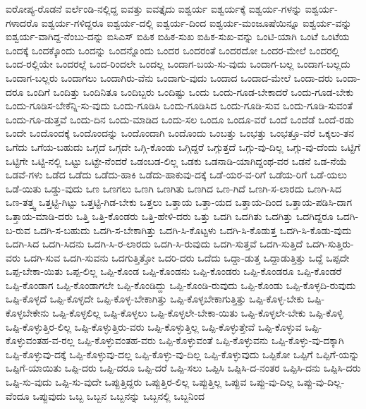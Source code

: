 {ಐರೋಪ್ಯ-ರೊಡನೆ
ಐರ್ಲೆಂಡಿ-ನಲ್ಲಿದ್ದ
ಐವತ್ತು
ಐವತ್ತೈದು
ಐಶ್ವರ್ಯ
ಐಶ್ವರ್ಯಕ್ಕೆ
ಐಶ್ವರ್ಯ-ಗಳನ್ನು
ಐಶ್ವರ್ಯ-ಗಳಾದರೊ
ಐಶ್ವರ್ಯ-ಗಳಿದ್ದರೂ
ಐಶ್ವರ್ಯ-ದಲ್ಲಿ
ಐಶ್ವರ್ಯ-ದಿಂದ
ಐಶ್ವರ್ಯ-ಮಂಜೂಷೆಯಿನ್ನೂ
ಐಶ್ವರ್ಯ-ವನ್ನು
ಐಶ್ವರ್ಯ-ವಾಗಿದ್ದ-ನೆಂಬು-ದನ್ನು
ಐಸಿಎಸ್
ಐಹಿಕ
ಐಹಿಕ-ಸುಖ
ಐಹಿಕ-ಸುಖ-ವನ್ನು
ಒಂಟಿ-ಯಾಗಿ
ಒಂಟೆ
ಒಂಟೆಯ
ಒಂದಕ್ಕೆ
ಒಂದಕ್ಕೊಂದು
ಒಂದನ್ನು
ಒಂದನ್ನೊಂದು
ಒಂದರ
ಒಂದರಂತೆ
ಒಂದರದೋ
ಒಂದರ-ಮೇಲೆ
ಒಂದರಲ್ಲಿ
ಒಂದ-ರಲ್ಲಿಯೇ
ಒಂದರಲ್ಲೆ
ಒಂದ-ರಿಂದಲೇ
ಒಂದಲ್ಲ
ಒಂದಾಗ-ಬಯ-ಸು-ವುದು
ಒಂದಾಗ-ಬಲ್ಲ
ಒಂದಾಗ-ಬಲ್ಲದು
ಒಂದಾಗ-ಬಲ್ಲರು
ಒಂದಾಗಲು
ಒಂದಾಗಿರು-ವೆನು
ಒಂದಾಗು-ವುದು
ಒಂದಾದ
ಒಂದಾದ-ಮೇಲೆ
ಒಂದಾ-ದರು
ಒಂದಾ-ದರೂ
ಒಂದಿಗೆ
ಒಂದಿತ್ತು
ಒಂದಿನಿತೂ
ಒಂದಿಬ್ಬರು
ಒಂದಿಷ್ಟು
ಒಂದು
ಒಂದು-ಗೂಡ-ಬೇಕಾದರೆ
ಒಂದು-ಗೂಡ-ಬೇಕು
ಒಂದು-ಗೂಡಿಸ-ಬೇಕೆನ್ನಿ-ಸು-ವುದು
ಒಂದು-ಗೂಡಿಸಿ
ಒಂದು-ಗೂಡಿಸಿದ
ಒಂದು-ಗೂಡಿ-ಸುವ
ಒಂದು-ಗೂಡಿ-ಸುವಂತೆ
ಒಂದು-ಗೂ-ಡುತ್ತವೆ
ಒಂದು-ದಿನ
ಒಂದು-ಮಾಡಿದ
ಒಂದು-ಸಲ
ಒಂದೂ
ಒಂದೂ-ವರೆ
ಒಂದೆ
ಒಂದೆಡೆ
ಒಂದೆ-ರಡು
ಒಂದೇ
ಒಂದೊಂದಕ್ಕೆ
ಒಂದೊಂದನ್ನು
ಒಂದೊಂದಾಗಿ
ಒಂದೊಂದು
ಒಂಬತ್ತು
ಒಂಭತ್ತು
ಒಂಭತ್ತೂ-ವರೆ
ಒಕ್ಕಲು-ತನ
ಒಗೆದು
ಒಗೆಯ-ಬಹುದು
ಒಗ್ಗದೆ
ಒಗ್ಗದೇ
ಒಗ್ಗಿ-ಕೊಂಡು
ಒಗ್ಗಿದ್ದರೆ
ಒಗ್ಗುತ್ತದೆ
ಒಗ್ಗು-ವು-ದಿಲ್ಲ
ಒಗ್ಗು-ವು-ದೆಂದು
ಒಟ್ಟಿಗೆ
ಒಟ್ಟಿಗೇ
ಒಟ್ಟಿ-ನಲ್ಲಿ
ಒಟ್ಟು
ಒಟ್ಟೇ-ನೆಂದರೆ
ಒಡಂಬಡ-ಲಿಲ್ಲ
ಒಡಕು
ಒಡನಾಡಿ-ಯಾಗಿದ್ದಂಥ-ವರ
ಒಡನೆ
ಒಡ-ನೆಯೆ
ಒಡವೆ-ಗಳು
ಒಡೆದ
ಒಡೆದು
ಒಡೆದು-ಹಾಕಿ
ಒಡೆದು-ಹಾಕುವು-ದಕ್ಕೆ
ಒಡೆ-ಯರ-ವ-ರಿಗೆ
ಒಡೆಯ-ರಿಗೆ
ಒಡೆ-ಯಲು
ಒಡೆ-ಯಿತು
ಒಡ್ಡು-ವುದು
ಒಣ
ಒಣಗಲು
ಒಣಗಿ
ಒಣಗಿತು
ಒಣಗಿದ
ಒಣ-ಗಿದೆ
ಒಣಗಿ-ಸ-ಲಾರದು
ಒಣಗಿ-ಸಿದ
ಒಣ-ತತ್ತ್ವ
ಒತ್ತಟ್ಟಿ-ಗಿಟ್ಟು
ಒತ್ತಟ್ಟಿ-ಗಿಡ-ಬೇಕು
ಒತ್ತಲು
ಒತ್ತಾಯ
ಒತ್ತಾ-ಯದ
ಒತ್ತಾಯ-ದಿಂದ
ಒತ್ತಾಯ-ಪಡಿಸಿ-ದಾಗ
ಒತ್ತಾಯ-ಮಾಡಿ-ದರು
ಒತ್ತಿ
ಒತ್ತಿ-ಕೊಂಡರು
ಒತ್ತಿ-ಹೇಳಿ-ದರು
ಒತ್ತು
ಒದಗಿ
ಒದಗಿತು
ಒದಗಿತ್ತು
ಒದಗಿದ್ದರೂ
ಒದಗಿ-ಬ-ರುವ
ಒದಗಿ-ಸ-ಬಹುದು
ಒದಗಿ-ಸ-ಬೇಕಾಗಿತ್ತು
ಒದಗಿ-ಸಿ-ಕೊಟ್ಟಳು
ಒದಗಿ-ಸಿ-ಕೊಡುತ್ತ
ಒದಗಿ-ಸಿ-ಕೊಡು-ವುದು
ಒದಗಿ-ಸಿದ
ಒದಗಿ-ಸಿದನು
ಒದಗಿ-ಸಿ-ರ-ಲಾರದು
ಒದಗಿ-ಸಿ-ರುವುದು
ಒದಗಿ-ಸುತ್ತವೆ
ಒದಗಿ-ಸುತ್ತಿದೆ
ಒದಗಿ-ಸುತ್ತಿರು-ವರು
ಒದಗಿ-ಸುವ
ಒದಗಿ-ಸುವನು
ಒದಗುತ್ತಿತ್ತೋ
ಒದರಿ-ದರು
ಒದೆದು
ಒದ್ದಾ-ಡುತ್ತ
ಒದ್ದಾಡುತ್ತಿತ್ತು
ಒದ್ದೆ
ಒಪ್ಪದೇ
ಒಪ್ಪ-ಬೇಕಾ-ಯಿತು
ಒಪ್ಪ-ಲಿಲ್ಲ
ಒಪ್ಪಿ-ಕೊಂಡ
ಒಪ್ಪಿ-ಕೊಂಡನು
ಒಪ್ಪಿ-ಕೊಂಡರು
ಒಪ್ಪಿ-ಕೊಂಡರೂ
ಒಪ್ಪಿ-ಕೊಂಡರೆ
ಒಪ್ಪಿ-ಕೊಂಡಾಗ
ಒಪ್ಪಿ-ಕೊಂಡಾಗಲೇ
ಒಪ್ಪಿ-ಕೊಂಡಿದ್ದು
ಒಪ್ಪಿ-ಕೊಂಡಿ-ರುವುದು
ಒಪ್ಪಿ-ಕೊಂಡು
ಒಪ್ಪಿ-ಕೊಳ್ಳದಿ-ರುವುದು
ಒಪ್ಪಿ-ಕೊಳ್ಳದೆ
ಒಪ್ಪಿ-ಕೊಳ್ಳದೇ
ಒಪ್ಪಿ-ಕೊಳ್ಳ-ಬೇಕಾಗಿತ್ತು
ಒಪ್ಪಿ-ಕೊಳ್ಳಬೇಕಾಗುತ್ತಿತ್ತು
ಒಪ್ಪಿ-ಕೊಳ್ಳ-ಬೇಕು
ಒಪ್ಪಿ-ಕೊಳ್ಳಬೇಕೇನು
ಒಪ್ಪಿ-ಕೊಳ್ಳಲಿಲ್ಲ
ಒಪ್ಪಿ-ಕೊಳ್ಳಲು
ಒಪ್ಪಿ-ಕೊಳ್ಳಲೇ-ಬೇಕಾ-ಯಿತು
ಒಪ್ಪಿ-ಕೊಳ್ಳಲೇ-ಬೇಕು
ಒಪ್ಪಿ-ಕೊಳ್ಳಿ
ಒಪ್ಪಿ-ಕೊಳ್ಳುತ್ತಿರ-ಲಿಲ್ಲ
ಒಪ್ಪಿ-ಕೊಳ್ಳುತ್ತಿರು-ವರು
ಒಪ್ಪಿ-ಕೊಳ್ಳುತ್ತಿಲ್ಲ
ಒಪ್ಪಿ-ಕೊಳ್ಳುತ್ತೇವೆ
ಒಪ್ಪಿ-ಕೊಳ್ಳುವ
ಒಪ್ಪಿ-ಕೊಳ್ಳುವಂತಹ-ವ-ರಲ್ಲ
ಒಪ್ಪಿ-ಕೊಳ್ಳುವಂತಹ-ವರು
ಒಪ್ಪಿ-ಕೊಳ್ಳುವಂತೆ
ಒಪ್ಪಿ-ಕೊಳ್ಳುವನು
ಒಪ್ಪಿ-ಕೊಳ್ಳು-ವು-ದಕ್ಕಾಗಿ
ಒಪ್ಪಿ-ಕೊಳ್ಳುವು-ದಕ್ಕೆ
ಒಪ್ಪಿ-ಕೊಳ್ಳುವು-ದಲ್ಲ
ಒಪ್ಪಿ-ಕೊಳ್ಳು-ವು-ದಿಲ್ಲ
ಒಪ್ಪಿ-ಕೊಳ್ಳುವುದು
ಒಪ್ಪಿಕೋ
ಒಪ್ಪಿಗೆ
ಒಪ್ಪಿಗೆ-ಯನ್ನು
ಒಪ್ಪಿಗೆ-ಯಾಯಿತು
ಒಪ್ಪಿ-ದರು
ಒಪ್ಪಿ-ದರೂ
ಒಪ್ಪಿ-ದರೆ
ಒಪ್ಪಿ-ಸಲು
ಒಪ್ಪಿಸಿ
ಒಪ್ಪಿಸಿ-ದ-ನಂತರ
ಒಪ್ಪಿಸಿ-ದನು
ಒಪ್ಪಿಸಿ-ದರು
ಒಪ್ಪಿ-ಸು-ವುದು
ಒಪ್ಪಿ-ಸು-ವುದೇ
ಒಪ್ಪುತ್ತಿದ್ದರು
ಒಪ್ಪುತ್ತಿರ-ಲಿಲ್ಲ
ಒಪ್ಪುತ್ತಿಲ್ಲ
ಒಪ್ಪುವ
ಒಪ್ಪು-ವು-ದಿಲ್ಲ
ಒಪ್ಪು-ವು-ದಿಲ್ಲ-ವೆಂದೂ
ಒಪ್ಪುವುದು
ಒಬ್ಬ
ಒಬ್ಬನ
ಒಬ್ಬನನ್ನು
ಒಬ್ಬನಲ್ಲಿ
ಒಬ್ಬನಿಂದ
}

